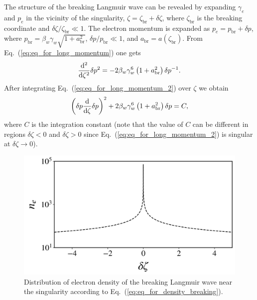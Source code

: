 \documentclass[10pt, a4paper, twoside, openright]{report}
\begin{document}
The structure of the breaking Langmuir wave can be revealed by expanding $ \gamma_e $ and $ p_e $ in the vicinity of the singularity, $ \zeta = \zeta_{\mathrm{br}} + \delta \zeta  $, where $ \zeta_{\mathrm{br}} $ is the breaking coordinate and $ \delta \zeta / \zeta_{\mathrm{br}} \ll 1 $. The electron momentum is expanded as $ p_e = p_{\mathrm{br}} + \delta p $, where $ p_{\mathrm{br}} = \beta_w \gamma_w \sqrt{1 + a_{\mathrm{br}}^2} $, $ \delta p / p_{\mathrm{br}} \ll 1 $, and $ a_{\mathrm{br}} = a \left( \zeta_{\mathrm{br}} \right) $. From Eq.~(\ref{eq:eq_for_long_momentum}) one gets \cite{Panchenko2008, Bulanov2013}
\begin{equation}\label{eq:eq_for_long_momentum_2}
\diff*[2]{\delta p^2 }{\zeta} = -2 \beta_w \gamma_w^6 \left( 1 + a_{\mathrm{br}}^2 \right) \delta p^{-1}.
\end{equation}
After integrating Eq.~(\ref{eq:eq_for_long_momentum_2}) over $ \zeta $ we obtain \cite{Panchenko2008, Bulanov2013}
\begin{equation}\label{eq:eq_for_long_momentum_3}
\left( \delta p \diff*{\delta p}{\zeta} \right)^2 + 2 \beta_w \gamma_w^6 \left( 1 + a_{\mathrm{br}}^2 \right) \delta p = C,
\end{equation}
where $ C $ is the integration constant (note that the value of $ C $ can be different in regions $ \delta \zeta < 0 $ and $ \delta \zeta > 0 $ since Eq.~(\ref{eq:eq_for_long_momentum_2}) is singular at $ \delta \zeta \rightarrow 0 $).

\begin{figure}[t]
	\includegraphics[width=0.5\linewidth]{img/breaking_wave.jpg}
	\caption[]{\label{fig:breaking_wave} Distribution of electron density of the breaking Langmuir wave near the singularity according to Eq.~(\ref{eq:eq_for_density_breaking}).}
\end{figure}
\end{document}
